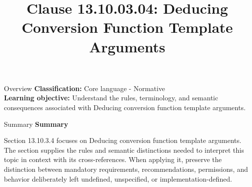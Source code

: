 \documentclass[10pt,letterpaper]{article}
\title{Clause 13.10.03.04: Deducing Conversion Function Template Arguments}
\author{}
\date{}
\begin{document}
\maketitle
\begin{CornellOverviewBox}{Overview}
\textbf{Classification:} Core language - Normative\\[2pt]
\textbf{Learning objective:} Understand the rules, terminology, and semantic consequences associated with Deducing conversion function template arguments.
\end{CornellOverviewBox}\begin{CornellSummaryBox}{Summary}
{\sffamily\bfseries\color{Accent} Summary}\par\vspace{3pt}Section 13.10.3.4 focuses on Deducing conversion function template arguments. The section supplies the rules and semantic distinctions needed to interpret this topic in context with its cross-references. When applying it, preserve the distinction between mandatory requirements, recommendations, permissions, and behavior deliberately left undefined, unspecified, or implementation-defined.
\end{CornellSummaryBox}
\end{document}
